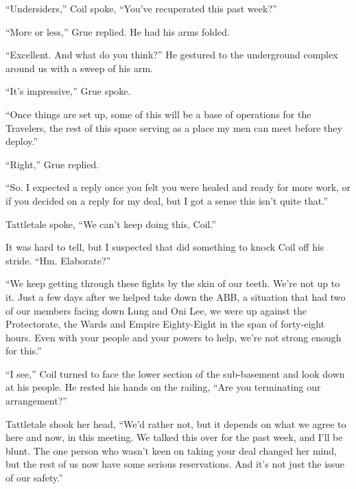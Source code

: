 ``Undersiders,'' Coil spoke, ``You've recuperated this past week?''



``More or less,'' Grue replied.  He had his arms folded.



``Excellent.  And what do you think?''  He gestured to the underground complex around us with a sweep of his arm.



``It's impressive,'' Grue spoke.



``Once things are set up, some of this will be a base of operations for the Travelers, the rest of this space serving as a place my men can meet before they deploy.''



``Right,'' Grue replied.



``So.  I expected a reply once you felt you were healed and ready for more work, or if you decided on a reply for my deal, but I got a sense this isn't quite that.''



Tattletale spoke, ``We can't keep doing this, Coil.''



It was hard to tell, but I suspected that did something to knock Coil off his stride.  ``Hm.  Elaborate?''



``We keep getting through these fights by the skin of our teeth.  We're not up to it.  Just a few days after we helped take down the ABB, a situation that had two of our members facing down Lung and Oni Lee, we were up against the Protectorate, the Wards and Empire Eighty-Eight in the span of forty-eight hours.  Even with your people and your powers to help, we're not strong enough for this.''



``I see,'' Coil turned to face the lower section of the sub-basement and look down at his people.  He rested his hands on the railing, ``Are you terminating our arrangement?''



Tattletale shook her head, ``We'd rather not, but it depends on what we agree to here and now, in this meeting.  We talked this over for the past week, and I'll be blunt.  The one person who wasn't keen on taking your deal changed her mind, but the rest of us now have some serious reservations.  And it's not just the issue of our safety.''



